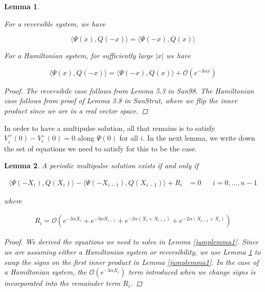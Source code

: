 \documentclass[12pt]{article}
\newtheorem{lemma}{Lemma}
\begin{document}

\begin{lemma}\label{otherIP}

For a reversible system, we have

\begin{equation}
\langle \Psi(x), Q(-x) \rangle = \langle \Psi(-x), Q(x) \rangle
\end{equation}

For a Hamiltonian system, for sufficiently large $|x|$ we have

\begin{equation}
\langle \Psi(x), Q(-x) \rangle = \langle \Psi(-x), Q(x) \rangle
+ \mathcal{O}(e^{-3 \alpha x})
\end{equation}

\begin{proof}
The reversibile case follows from Lemma 5.3 in San98. The Hamiltonian case follows from proof of Lemma 3.8 in SanStrut, where we flip the inner product since we are in a real vector space. 
\end{proof}
\end{lemma}

In order to have a multipulse solution, all that remains is to satisfy $V_i^+(0) - V_i^-(0) = 0$ along $\Psi(0)$ for all $i$. In the next lemma, we write down the set of equations we need to satisfy for this to be the case.

\begin{lemma}\label{IPsystem}
A periodic multipulse solution exists if and only if 

\begin{align}\label{jumpIPdiff}
\langle \Psi(-X_i), Q(X_i) \rangle - \langle \Psi(-X_{i-1}), Q(X_{i-1}) \rangle + R_i &= 0 && i = 0, \dots, n-1
\end{align}

where 

\begin{align*}
R_i = \mathcal{O} ( e^{-3 \alpha X_i} +  e^{-3 \alpha X_{i-1}}
+ e^{-2 \alpha (X_i + X_{i+1})} + e^{-2 \alpha (X_{i-1} + X_i)})
\end{align*}

\begin{proof}
We derived the equations we need to solve in Lemma \ref{jumplemma1}. Since we are assuming either a Hamiltonian system or reversibility, we use Lemma \ref{otherIP} to swap the signs on the first inner product in Lemma \ref{jumplemma1}. In the case of a Hamiltonian system, the $\mathcal{O}(e^{-3 \alpha X_i})$ term introduced when we change signs is incorporated into the remainder term $R_i$.
\end{proof}
\end{lemma}
\end{document}

